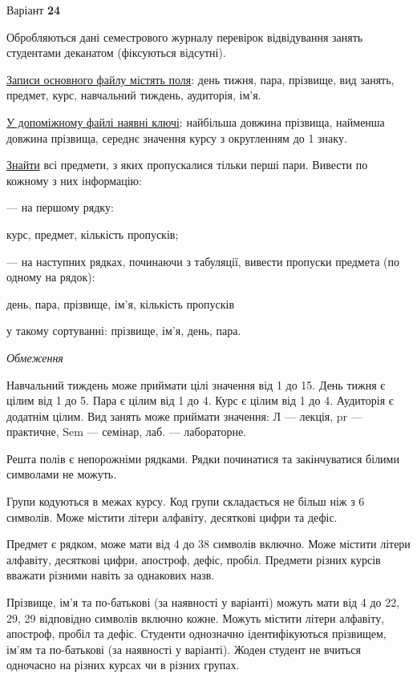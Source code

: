 \documentclass[11pt, ukrainian]{article}
\begin{document}


\par
\newpage
{\center Варіант  \No \textbf { 24 }\par}
\bigskip
Обробляються дані семестрового журналу перевірок відвідування занять студентами деканатом (фіксуються відсутні). 

\underline{Записи основного файлу містять поля}: день тижня, пара, прізвище, вид занять, предмет, курс, навчальний тиждень, аудиторія, ім’я.

\underline{У допоміжному файлі наявні ключі}: найбільша довжина прізвища, найменша довжина прізвища, середнє значення курсу з округленням до 1 знаку.

\underline{Знайти} всі предмети, з яких пропускалися тільки перші пари. Вивести по кожному з них інформацію:\par
{\noindent}--- на першому рядку:\par
курс, предмет, кількість пропусків;

{\noindent}--- на наступних рядках, починаючи з табуляції, вивести пропуски предмета (по одному на рядок):\par
день, пара, прізвище, ім’я, кількість пропусків

{\noindent}у такому сортуванні: прізвище, ім’я, день, пара.


\bigskip\textit{Обмеження}

Навчальний тиждень може приймати цілі значення від 1 до 15.
День тижня є цілим від 1 до 5. Пара є цілим від 1 до 4.
Курс є цілим від 1 до 4. Аудиторія є додатнім цілим.
Вид занять може приймати значення:
Л --- лекція, pr --- практичне, Sem --- семінар, лаб. --- лабораторне.

Решта полів є непорожніми рядками.
Рядки починатися та закінчуватися білими символами не можуть.

Групи кодуються в межах курсу.
Код групи складається не більш ніж з 6 символів.
Може містити літери алфавіту, десяткові цифри та дефіс.

Предмет є рядком, може мати від 4 до 38 символів включно.
Може містити літери алфавіту, десяткові цифри, апостроф, дефіс, пробіл.
Предмети різних курсів вважати різними навіть за однакових назв.

Прізвище, ім’я та по-батькові (за наявності у варіанті)
можуть мати від 4 до 22, 29, 29 відповідно символів включно кожне.
Можуть містити літери алфавіту, апостроф, пробіл та дефіс.
Студенти однозначно ідентифікуються прізвищем, ім’ям та по-батькові (за наявності у варіанті).
Жоден студент не вчиться одночасно на різних курсах чи в різних групах.
\end{document}
